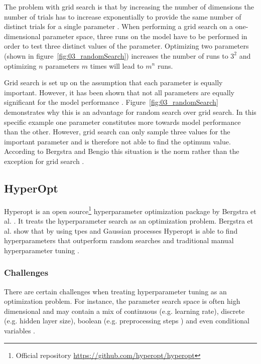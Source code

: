 The problem with grid search is that by increasing the number of dimensions the number of trials has to increase exponentially to provide the same number of distinct trials for a single parameter \cite{Bergstra2012a}. When performing a grid search on a one-dimensional parameter space, three runs on the model have to be performed in order to test three distinct values of the parameter. Optimizing two parameters {(shown in figure~\ref{fig:03_randomSearch})} increases the number of runs to $3^2$ and optimizing $n$ parameters $m$ times will lead to $m^n$ runs. 

Grid search is set up on the assumption that each parameter is equally important. However, it has been shown that not all parameters are equally significant for the model performance \cite{Bergstra2012a}. Figure~\ref{fig:03_randomSearch} demonstrates why this is an advantage for random search over grid search. In this specific example one parameter constitutes more towards model performance than the other. However, grid search can only sample three values for the important parameter and is therefore not able to find the optimum value. According to Bergstra and Bengio this situation is the norm rather than the exception for grid search \cite{Bergstra2012a}.

\subsection{HyperOpt}

Hyperopt is an open source\footnote{Official repository \url{https://github.com/hyperopt/hyperopt}} hyperparameter optimization package by Bergstra et al. \cite{Bergstra2013a}. It treats the hyperparameter search as an optimization problem. Bergstra et al. show that by using \glspl{tpe} and Gaussian processes Hyperopt is able to find hyperparameters that outperform random searches and traditional manual hyperparameter tuning \cite{Bergstra2011}.




\subsubsection*{Challenges}

There are certain challenges when treating hyperparameter tuning as an optimization problem. For instance, the parameter search space is often high dimensional and may contain a mix of continuous {(e.g. learning rate)}, discrete {(e.g. hidden layer size)}, boolean {(e.g. preprocessing steps \cite{Hutter2009})} and even conditional variables \cite{Bergstra2013}. 

